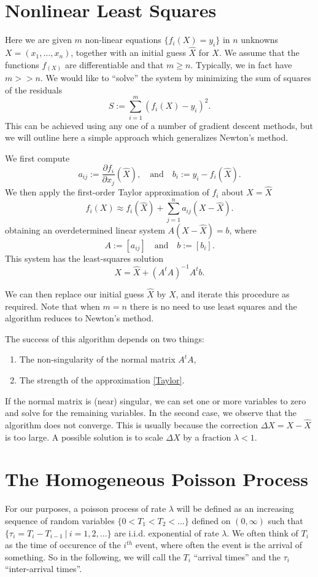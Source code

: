\documentclass[12pt,leqno]{article}
\begin{document}
\section{Nonlinear Least Squares}\label{NLS}
Here we are given $m$ non-linear equations $\{f_i(X) = y_i\}$ in $n$ unknowns $X = (x_1,\dots,x_n)$,
together with an initial guess $\hat{X}$ for $X$.  We assume that the functions $f_(X)$ are differentiable
and that $m \ge n$. Typically, we in fact have $m >> n$.  We would like to ``solve'' the system by minimizing
the sum of squares of the residuals
$$
S := \sum_{i=1}^m (f_i(X)-y_i)^2.
$$
This can be achieved using any one of a number of gradient descent methods, but we will outline here a
simple approach which generalizes Newton's method.

We first compute
$$
a_{ij} := \frac{\partial{f_i}}{\partial{x_j}}(\hat{X}),\quad\text{and}\quad b_i := y_i - f_i(\hat{X}).
$$
We then apply the first-order Taylor approximation of $f_i$ about  $X = \hat{X}$  
\begin{equation} \label{Taylor}
f_i(X) \approx f_i(\hat{X}) + \sum_{j=1}^na_{ij}(X - \hat{X}).
\end{equation}
obtaining an overdetermined linear system $A(X-\hat{X}) = b$, 
where
$$
A := [a_{ij}]\quad\text{and}\quad b := [b_i].
$$
This system has the least-squares solution
$$
X = \hat{X} + (A^tA)^{-1}A^tb.
$$

We can then replace our initial guess $\hat{X}$ by $X$, and iterate this procedure as required.
Note that when $m = n$ there is no need to use least squares and the algorithm reduces to Newton's method.

The success of this algorithm depends on two things:
\begin{enumerate}
\item The non-singularity of the normal matrix $A^tA$,
\item The strength of the approximation \eqref{Taylor}.
\end{enumerate}
If the normal matrix is (near) singular, we can set one or more variables to zero and solve for the remaining
variables.  In the second case, we observe that the algorithm does not converge.  This is usually because the
correction $\Delta{X} = X-\hat{X}$ is too large. A possible solution is to scale $\Delta{X}$ by a fraction
$\lambda < 1$.  

\section{The Homogeneous Poisson Process}
For our purposes, a poisson process of rate $\lambda$ will be defined as an increasing sequence of random variables
$ \{0 < T_1 < T_2 < \dots\}$ defined on $(0,\infty)$ such that $\{\tau_i = T_i-T_{i-1}~|~ i = 1,2,\dots\}$ are i.i.d.
exponential of rate $\lambda$. We often think of $T_i$ as the time of occurence of the $i^{th}$
event, where often the event is the arrival of something.  So in the following, we will call the $T_i$
``arrival times'' and the $\tau_i$ ``inter-arrival times''.  
\end{document}
